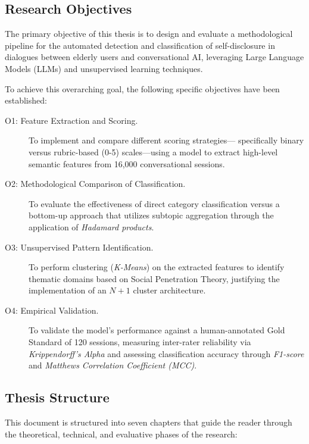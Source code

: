     
    \subsection{Research Objectives}

The primary objective of this thesis is to design and evaluate a methodological pipeline for the automated detection and classification of self-disclosure in dialogues between elderly users and conversational AI, leveraging Large Language Models (LLMs) and unsupervised learning techniques.

To achieve this overarching goal, the following specific objectives have been established:

\begin{description}
    \item[O1: Feature Extraction and Scoring.] To implement and compare different scoring strategies— specifically binary versus rubric-based (0-5) scales—using a model to extract high-level semantic features from 16,000 conversational sessions.
    \item[O2: Methodological Comparison of Classification.] To evaluate the effectiveness of direct category classification versus a bottom-up approach that utilizes subtopic aggregation through the application of \textit{Hadamard products}.
    \item[O3: Unsupervised Pattern Identification.] To perform clustering (\textit{K-Means}) on the extracted features to identify thematic domains based on Social Penetration Theory, justifying the implementation of an $N+1$ cluster architecture.
    \item[O4: Empirical Validation.] To validate the model's performance against a human-annotated Gold Standard of 120 sessions, measuring inter-rater reliability via \textit{Krippendorff’s Alpha} and assessing classification accuracy through \textit{F1-score} and \textit{Matthews Correlation Coefficient (MCC)}.
\end{description}
        
    \subsection{Thesis Structure}


    This document is structured into seven chapters that guide the reader through the theoretical, technical, and evaluative phases of the research:

